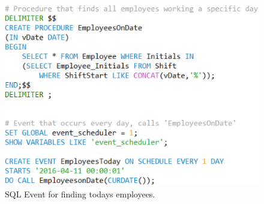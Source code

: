 \begin{figure}[h]
    \centering
    \includegraphics[scale=.75]{img/SQL_EVENT}
    \caption{SQL Event for finding todays employees.}
    \label{fig:event}
\end{figure}

